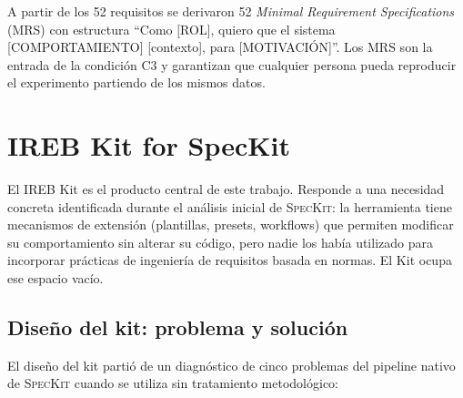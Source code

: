 A partir de los 52 requisitos se derivaron 52 \emph{Minimal Requirement Specifications} (MRS) con estructura ``Como [ROL], quiero que el sistema [COMPORTAMIENTO] [contexto], para [MOTIVACI\'ON]''. Los MRS son la entrada de la condici\'on C3 y garantizan que cualquier persona pueda reproducir el experimento partiendo de los mismos datos.

\section{IREB Kit for SpecKit}

El IREB Kit es el producto central de este trabajo. Responde a una necesidad concreta identificada durante el an\'alisis inicial de \textsc{SpecKit}: la herramienta tiene mecanismos de extensi\'on (plantillas, presets, workflows) que permiten modificar su comportamiento sin alterar su c\'odigo, pero nadie los hab\'ia utilizado para incorporar pr\'acticas de ingenier\'ia de requisitos basada en normas. El Kit ocupa ese espacio vac\'io.

\subsection{Dise\~no del kit: problema y soluci\'on}

El dise\~no del kit parti\'o de un diagn\'ostico de cinco problemas del pipeline nativo de \textsc{SpecKit} cuando se utiliza sin tratamiento metodol\'ogico:

